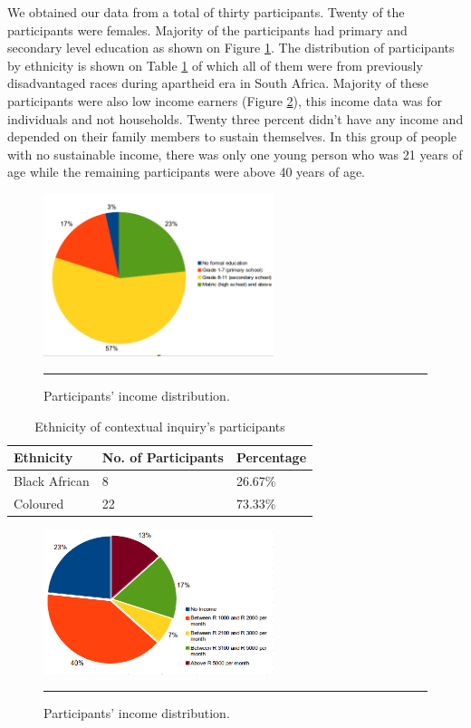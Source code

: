 We obtained our data from a total of thirty participants. Twenty of the participants were females. Majority of the participants had primary and secondary level education as shown on Figure \ref{figure:education_level}. The distribution of participants by ethnicity is shown on Table \ref{table:ethnicity} of which all of them were from previously disadvantaged races during apartheid era in South Africa. Majority of these participants were also low income earners (Figure \ref{figure:income_distr}), this income data was for individuals and not households. Twenty three percent didn't have any income and depended on their family members to sustain themselves. In this group of people with no  sustainable income, there was only one young person who was 21 years of age while the remaining participants were above 40 years of age.
\begin{figure}[htbp]
  \centering
    \includegraphics[width=0.6\textwidth]{Figures/education_level.png}
    \rule{35em}{0.5pt}
  \caption{Participants' income distribution.}
  \label{figure:education_level}
\end{figure}

\begin{table}[h!]
  \begin{center}
    \caption{Ethnicity of contextual inquiry's participants}
    \label{table:ethnicity}
	\begin{tabular}{|p{3cm}|p{4cm}|p{2cm}|}
		\hline
		\textbf{Ethnicity}&\textbf{No. of Participants}&\textbf{Percentage}\\
		\hline
		 Black African&8 &26.67\% \\
		\hline
		 Coloured&22& 73.33\%\\
	\hline
	\end{tabular}
  \end{center}
\end{table}

\begin{figure}[htbp]
  \centering
    \includegraphics[width=0.6\textwidth]{Figures/income_distr.png}
    \rule{35em}{0.5pt}
  \caption{Participants' income distribution.}
  \label{figure:income_distr}
\end{figure}

